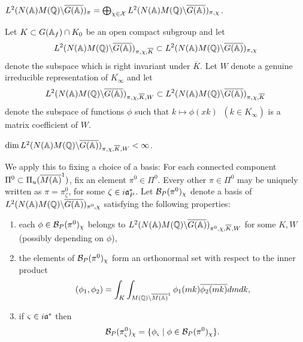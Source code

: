 \begin{proposition}
$L^2(N({\Bbb{A}})M({\Bbb{Q}})\backslash \overline{G({\Bbb{A}})})_\pi
=\bigoplus_{\chi \in {\cal X}}
L^2(N({\Bbb{A}})M({\Bbb{Q}})\backslash \overline{G({\Bbb{A}})})_{\pi ,\chi}$.
\end{proposition}

Let $K\subset G({\Bbb{A}}_f)\cap K_0$ be an open compact subgroup and let 
\begin{equation}
L^2(N({\Bbb{A}})M({\Bbb{Q}})\backslash
\overline{G({\Bbb{A}})})_{\pi ,\chi ,\overline{K}}
\subset
L^2(N({\Bbb{A}})M({\Bbb{Q}})\backslash \overline{G({\Bbb{A}})})_{\pi ,\chi} 
\end{equation}
denote the subspace which is right invariant under
$\overline{K}$. Let $W$ denote a genuine
irreducible representation of $\overline{K_\infty} $ and let 
\begin{equation}
L^2(N({\Bbb{A}})M({\Bbb{Q}})\backslash
\overline{G({\Bbb{A}})})_{\pi ,\chi ,\overline{K},W}
\subset
L^2(N({\Bbb{A}})M({\Bbb{Q}})\backslash
\overline{G({\Bbb{A}})})_{\pi ,\chi ,\overline{K}}
\end{equation}
denote the subspace of functions $\phi $ such that
$k\longmapsto \phi (xk)\;\;(k\in \overline{K_\infty} )$
is a matrix coefficient of $W$.

\begin{proposition}
$\dim
L^2(N({\Bbb{A}})M({\Bbb{Q}})\backslash
\overline{G({\Bbb{A}})})_{\pi ,\chi ,\overline{K},W}<\infty $.
\end{proposition}

We apply this to fixing a choice of a basis:
For each connected component $\Pi^0\subset
\Pi_u(\overline{M({\Bbb{A}})}^1)$, fix an element $\pi^0\in \Pi^0$.
Every other $\pi\in\Pi^0$ may be uniquely written as
$\pi=\pi^0_\zeta$, for some $\zeta\in i{\frak{a}}^*_P$.
Let ${\cal B}_P(\pi^0 )_\chi $
denote a basis of
$L^2(N({\Bbb{A}})M({\Bbb{Q}})\backslash
\overline{G({\Bbb{A}})})_{\pi^0 ,\chi} $ satisfying the following
properties:

\begin{enumerate}
\item  each $\phi \in {\cal B}_P(\pi^0 )_\chi $ belongs to
$L^2(N({\Bbb{A}})M({\Bbb{Q}})\backslash
\overline{G({\Bbb{A}})})_{\pi^0,\chi ,\overline{K},W}$
for some $K,W$ (possibly depending on $\phi $),

\item  the elements of ${\cal B}_P(\pi^0 )_\chi $
form an orthonormal set with
respect to the inner product
\[
(\phi _1,\phi _2)=
\int_K\int_{M({\Bbb{Q}})\backslash \overline{M({\Bbb{A}})}^1}
\phi _1(mk)\overline{\phi _2(mk)}dmdk,
\]

\item  if $\varsigma \in i{\frak{a}}^{*}$ then 
\[
{\cal B}_P(\pi^0_\varsigma )_\chi =\{\phi _\varsigma \;|\;
\phi \in {\cal B}_P(\pi^0 )_\chi \}.
\]
\end{enumerate}

